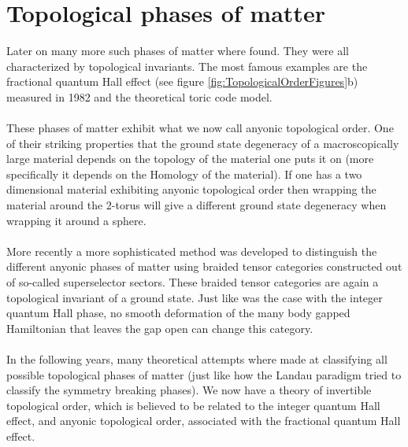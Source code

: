 \section{Topological phases of matter}
Later on many more such phases of matter where found. They were all characterized by topological invariants. The most famous examples are the fractional quantum Hall effect (see figure \ref{fig:TopologicalOrderFigures}b) measured in 1982 and the theoretical toric code model. 
\\\\
These phases of matter exhibit what we now call anyonic topological order. One of their striking properties that the ground state degeneracy of a macroscopically large material depends on the topology of the material one puts it on (more specifically it depends on the Homology of the material). If one has a two dimensional material exhibiting anyonic topological order then wrapping the material around the 2-torus will give a different ground state degeneracy when wrapping it around a sphere.
\\\\
More recently a more sophisticated method was developed to distinguish the different anyonic phases of matter using braided tensor categories constructed out of so-called superselector sectors. These braided tensor categories are again a topological invariant of a ground state. Just like was the case with the integer quantum Hall phase, no smooth deformation of the many body gapped Hamiltonian that leaves the gap open can change this category.
\\\\
In the following years, many theoretical attempts where made at classifying all possible topological phases of matter (just like how the Landau paradigm tried to classify the symmetry breaking phases). We now have a theory of invertible topological order, which is believed to be related to the integer quantum Hall effect, and anyonic topological order, associated with the fractional quantum Hall effect.
